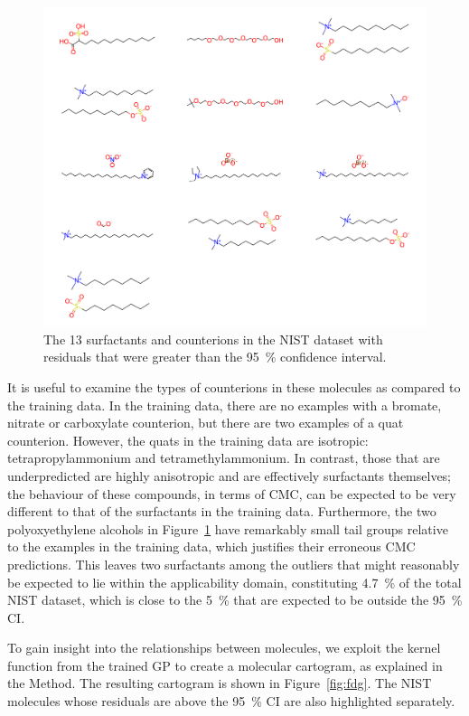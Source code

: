 \begin{figure}
    \includegraphics[width=\textwidth]{images/nist-underpred.pdf}
    \caption{The 13 surfactants and counterions in the NIST dataset with residuals
        that were greater than the \SI{95}{\%} confidence interval.}
    \label{fig:nist-underpred}
\end{figure}

It is useful to examine the types of counterions in these molecules as compared
to the training data. In the training data, there are no examples with a
bromate, nitrate or carboxylate counterion, but there are two examples of a quat
counterion. However, the quats in the training data are isotropic:
tetrapropylammonium and tetramethylammonium. In contrast, those that are
underpredicted are highly anisotropic and are effectively surfactants
themselves; the behaviour of these compounds, in terms of CMC, can be expected
to be very different to that of the surfactants in the training data.
Furthermore, the two polyoxyethylene alcohols in Figure~\ref{fig:nist-underpred}
have remarkably small tail groups relative to the examples in the training data,
which justifies their erroneous CMC predictions. This leaves two surfactants
among the outliers that might reasonably be expected to lie within the
applicability domain, constituting \SI{4.7}{\%} of the total NIST dataset, which
is close to the \SI{5}{\%} that are expected to be outside the \SI{95}{\%} CI.

To gain insight into the relationships between molecules, we exploit the kernel
function from the trained GP to create a molecular cartogram, as explained in
the Method. The resulting cartogram is shown in Figure~\ref{fig:fdg}. The NIST
molecules whose residuals are above the \SI{95}{\%} CI are also highlighted
separately.

